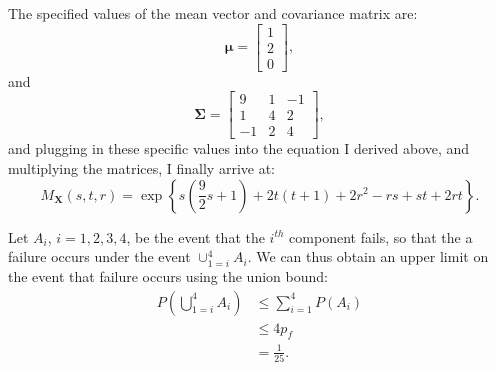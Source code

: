 \begin{problem}{16}
The specified values of the mean vector and covariance matrix are:
\begin{equation*}
 \bm \mu = \left[\begin{matrix}
    1\\
    2 \\
    0
\end{matrix}\right],
\end{equation*}
and 
\begin{equation*}
\bm \Sigma = \left[\begin{matrix}
    9& 1 &-1 \\
    1& 4 & 2 \\
    -1& 2 &4
\end{matrix}\right],
\end{equation*}
and plugging in these specific values into the equation I derived above, and multiplying the matrices, I finally arrive at:
\begin{equation*}
M_{\bm X}(s, t, r) = \exp \left \{ s\left (\frac{9}{2}s+1 \right)+2t(t+1)+2r^2-rs+st+2rt \right \}.
\end{equation*}

\end{problem}

\begin{problem}{17}  Let $A_i$, $i=1, 2, 3, 4$, be the event that the $i^{th}$ component fails, so that the a failure occurs under the event $\cup_{1=i}^4A_i$.  We can thus obtain an upper limit on the event that failure occurs using the union bound:
\begin{align*}
P\left(\bigcup_{1=i}^4A_i\right) & \le \sum_{i=1}^4P(A_i) \\
& \le 4 p_f \\
&=\frac{1}{25}.
\end{align*}

\end{problem}

